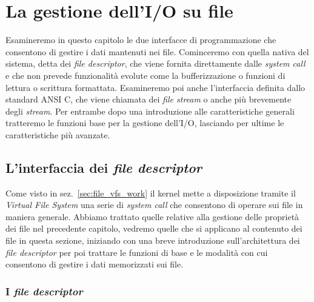 
\chapter{La gestione dell'I/O su file}
\label{cha:file_IO_interface}

Esamineremo in questo capitolo le due interfacce di programmazione che
consentono di gestire i dati mantenuti nei file. Cominceremo con quella nativa
del sistema, detta dei \textit{file descriptor}, che viene fornita
direttamente dalle \textit{system call} e che non prevede funzionalità evolute
come la bufferizzazione o funzioni di lettura o scrittura
formattata. Esamineremo poi anche l'interfaccia definita dallo standard ANSI
C, che viene chiamata dei \textit{file stream} o anche più brevemente degli
\textit{stream}. Per entrambe dopo una introduzione alle caratteristiche
generali tratteremo le funzioni base per la gestione dell'I/O, lasciando per
ultime le caratteristiche più avanzate.


\section{L'interfaccia dei \textit{file descriptor}}
\label{sec:file_unix_interface}


Come visto in sez.~\ref{sec:file_vfs_work} il kernel mette a disposizione
tramite il \textit{Virtual File System} una serie di \textit{system call} che
consentono di operare sui file in maniera generale. Abbiamo trattato quelle
relative alla gestione delle proprietà dei file nel precedente capitolo,
vedremo quelle che si applicano al contenuto dei file in questa sezione,
iniziando con una breve introduzione sull'architettura dei \textit{file
  descriptor} per poi trattare le funzioni di base e le modalità con cui
consentono di gestire i dati memorizzati sui file.


\subsection{I \textit{file descriptor}}
\label{sec:file_fd}

